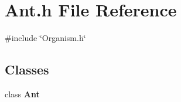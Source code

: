 \section{Ant.\+h File Reference}
\label{Ant_8h}
{\ttfamily \#include \char`\"{}Organism.\+h\char`\"{}}\newline
\subsection*{Classes}
\begin{DoxyCompactItemize}
\item 
class \textbf{ Ant}
\end{DoxyCompactItemize}
